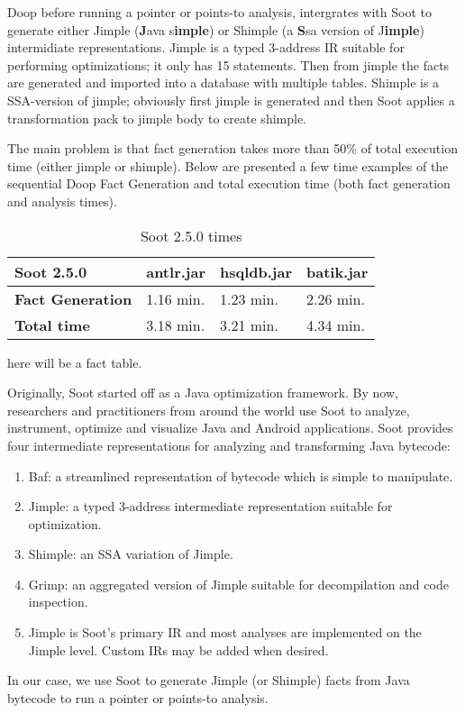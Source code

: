 \documentclass{dithesis}
\begin{document}
        Doop before running a pointer or points-to analysis, intergrates with Soot to generate either Jimple (\textbf{J}ava s\textbf{imple}) or Shimple (a \textbf{S}sa version of J\textbf{imple}) intermidiate representations. Jimple is a typed 3-address IR suitable for performing optimizations; it only has 15 statements. Then from jimple the facts are generated and imported into a database with multiple tables. Shimple is a SSA-version of jimple; obviously first jimple is generated and then Soot applies a transformation pack to jimple body to create shimple. 

        The main problem is that fact generation takes more than 50\% of total execution time (either jimple or shimple). Below are presented a few time examples of the sequential Doop Fact Generation and total execution time (both fact generation and analysis times). 

        \begin{table}[H]
            \centering
            \label{my-label}
            \begin{tabular}{llll}
                \hline
                \textbf{Soot 2.5.0}      & \textbf{antlr.jar} & \textbf{hsqldb.jar} & \textbf{batik.jar} \\ \hline
                \textbf{Fact Generation} & 1.16 min.          & 1.23 min.           & 2.26 min.          \\
                \textbf{Total time}      & 3.18 min.          & 3.21 min.           & 4.34 min.          \\ \hline
            \end{tabular}
            \caption{Soot 2.5.0 times}
        \end{table}

    	here will be a fact table.


    Originally, Soot started off as a Java optimization framework. By now, researchers and practitioners from around the world use Soot to analyze, instrument, optimize and visualize Java and Android applications. Soot provides four intermediate representations for analyzing and transforming Java bytecode:
	\begin{enumerate}
		\item Baf: a streamlined representation of bytecode which is simple to manipulate.
		\item Jimple: a typed 3-address intermediate representation suitable for optimization.
		\item Shimple: an SSA variation of Jimple.
		\item Grimp: an aggregated version of Jimple suitable for decompilation and code inspection.
		\item Jimple is Soot’s primary IR and most analyses are implemented on the Jimple level. Custom IRs may be added when desired.
	\end{enumerate}
    In our case, we use Soot to generate Jimple (or Shimple) facts from Java bytecode to run a pointer or points-to analysis.
    \cite{Sable: Soot}
    
\end{document}
